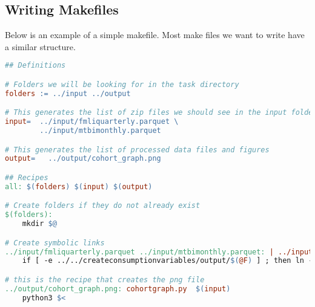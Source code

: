 \subsection{Writing Makefiles}

Below is an example of a simple makefile. Most make files we want to write have a similar structure.

\begin{lstlisting}[language=make]
## Definitions

# Folders we will be looking for in the task directory
folders := ../input ../output

# This generates the list of zip files we should see in the input folder 	
input=  ../input/fmliquarterly.parquet \
		../input/mtbimonthly.parquet 

# This generates the list of processed data files and figures
output=   ../output/cohort_graph.png 

## Recipes
all: $(folders) $(input) $(output)

# Create folders if they do not already exist
$(folders):
	mkdir $@

# Create symbolic links
../input/fmliquarterly.parquet ../input/mtbimonthly.parquet: | ../input
	if [ -e ../../createconsumptionvariables/output/$(@F) ] ; then ln -s ../../createconsumptionvariables/output/$(@F) $@ ; else exit 1; fi	

# this is the recipe that creates the png file
../output/cohort_graph.png: cohortgraph.py  $(input)
	python3 $<
\end{lstlisting}


